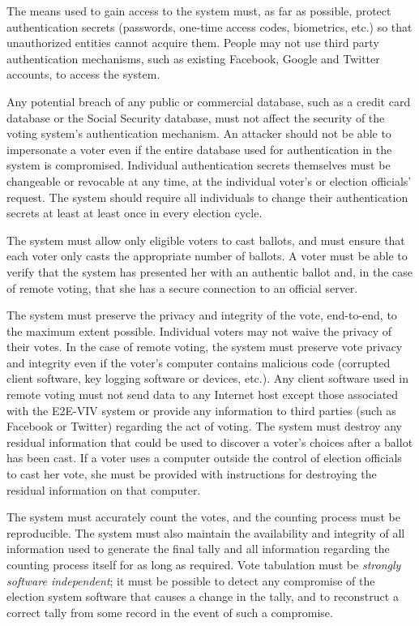 The means used to gain access to the system must, as far as possible,
protect authentication secrets (passwords, one-time access codes,
biometrics, etc.) so that unauthorized entities cannot acquire
them. People may not use third party authentication mechanisms, such
as existing Facebook, Google and Twitter accounts, to access the
system. 

Any potential breach of any public or commercial database, such as a
credit card database or the Social Security database, must not affect
the security of the voting system's authentication mechanism. An
attacker should not be able to impersonate a voter even if the entire
database used for authentication in the system is
compromised. Individual authentication secrets themselves must be
changeable or revocable at any time, at the individual voter's or
election officials' request. The system should require all individuals
to change their authentication secrets at least at least once in every
election cycle.

The system must allow only eligible voters to cast ballots, and must
ensure that each voter only casts the appropriate number of ballots. A
voter must be able to verify that the system has presented her with an
authentic ballot and, in the case of remote voting, that she has a
secure connection to an official server.

The system must preserve the privacy and integrity of the vote,
end-to-end, to the maximum extent possible. Individual voters may not
waive the privacy of their votes. In the case of remote voting, the
system must preserve vote privacy and integrity even if the voter's
computer contains malicious code (corrupted client software, key
logging software or devices, etc.). Any client software used in remote
voting must not send data to any Internet host except those associated
with the E2E-VIV system or provide any information to third parties
(such as Facebook or Twitter) regarding the act of voting. The system
must destroy any residual information that could be used to discover a
voter's choices after a ballot has been cast. If a voter uses a
computer outside the control of election officials to cast her vote,
she must be provided with instructions for destroying the residual
information on that computer.

The system must accurately count the votes, and the counting process
must be reproducible. The system must also maintain the availability
and integrity of all information used to generate the final tally and
all information regarding the counting process itself for as long as
required. Vote tabulation must be \emph{strongly software
  independent}; it must be possible to detect any compromise of the
election system software that causes a change in the tally, and to
reconstruct a correct tally from some record in the event of such a
compromise.

